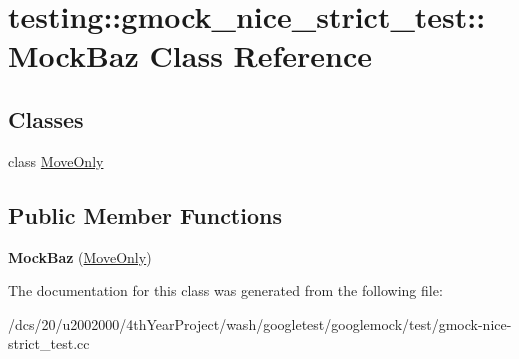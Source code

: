 \hypertarget{classtesting_1_1gmock__nice__strict__test_1_1MockBaz}{}\section{testing\+:\+:gmock\+\_\+nice\+\_\+strict\+\_\+test\+:\+:Mock\+Baz Class Reference}
\label{classtesting_1_1gmock__nice__strict__test_1_1MockBaz}
\subsection*{Classes}
\begin{DoxyCompactItemize}
\item 
class \mbox{\hyperlink{classtesting_1_1gmock__nice__strict__test_1_1MockBaz_1_1MoveOnly}{Move\+Only}}
\end{DoxyCompactItemize}
\subsection*{Public Member Functions}
\begin{DoxyCompactItemize}
\item 
\mbox{\label{classtesting_1_1gmock__nice__strict__test_1_1MockBaz_a128aba703e849d19887fc4788c2db4a1}} 
{\bfseries Mock\+Baz} (\mbox{\hyperlink{classtesting_1_1gmock__nice__strict__test_1_1MockBaz_1_1MoveOnly}{Move\+Only}})
\end{DoxyCompactItemize}


The documentation for this class was generated from the following file\+:\begin{DoxyCompactItemize}
\item 
/dcs/20/u2002000/4th\+Year\+Project/wash/googletest/googlemock/test/gmock-\/nice-\/strict\+\_\+test.\+cc\end{DoxyCompactItemize}
